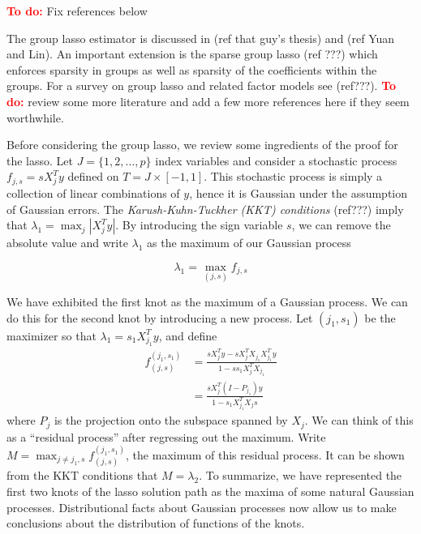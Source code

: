\documentclass{imsart}
\newcommand{\todo}{\textcolor{red}{\textbf{To do: }}}
\begin{document}

\todo Fix references below

The group lasso estimator is discussed in (ref that guy's thesis) and
(ref Yuan and Lin).  An important extension is the sparse group lasso
(ref ???) which enforces sparsity in groups as well as sparsity of the
coefficients within the groups.  For a survey on group lasso and
related factor models see (ref???). \todo review some more literature
and add a few more references here if they seem worthwhile. 



Before considering the group lasso, we review some ingredients of the
proof for the lasso. Let $J = \{ 1, 2, \ldots, p \}$ index variables
and consider a stochastic process $f_{j,s} = sX_j^Ty$ defined on $T =
J \times [ -1, 1 ]$. This stochastic process is simply a collection of
linear combinations of $y$, hence it is Gaussian under the assumption
of Gaussian errors. The \emph{Karush-Kuhn-Tuckher (KKT) conditions}
(ref???) imply that $\lambda_1 = \max_j |X_j^Ty|$. By introducing the
sign variable $s$, we can remove the absolute value and write
$\lambda_1$ as the maximum of our Gaussian process 

\begin{equation}
\lambda_1 = \max_{(j,s)} f_{j,s}
\end{equation}

We have exhibited the first knot as the maximum of a Gaussian
process. We can do this for the second knot by introducing a new
process. Let $(j_1, s_1)$ be the maximizer so that $\lambda_1 =
s_1X_{j_1}^Ty$, and define 
\begin{equation}
\begin{aligned}
  f^{(j_1,s_1)}_{(j,s)} & = \frac{ sX_j^T y - s X_j^T X_{j_1} X_{j_1}^Ty  } { 1 -  ss_1 X_j^TX_{j_1}} \\
  & = \frac{ sX_j^T(I-P_{j_1}) y }{ 1 -  s_1 X_{j_1}^T X_js}
\end{aligned}
\end{equation}
where $P_j$ is the projection onto the subspace spanned by $X_j$. We
can think of this as a ``residual process'' after regressing out the
maximum. Write $M = \max_{j \neq j_1, s} f^{(j_1,s_1)}_{(j,s)}$, the
maximum of this residual process. It can be shown from the KKT
conditions that $M  = \lambda_2$. To summarize, we have represented
the first two knots of the lasso solution path as the maxima of some
natural Gaussian processes. Distributional facts about Gaussian
processes now allow us to make conclusions about the distribution of
functions of the knots. 
\end{document}
